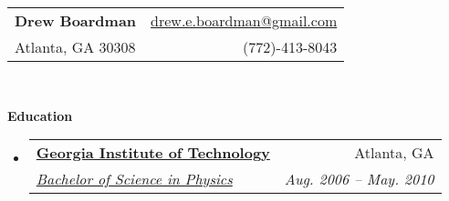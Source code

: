 \documentclass[letterpaper,11pt]{article}
\makeatletter
\newcommand{\resheading}[1]{{\large \colorbox{mygrey}{\begin{minipage}{\textwidth}{\textbf{#1 \vphantom{p\^{E}}}}\end{minipage}}}}
\newcommand{\ressubheading}[4]{
\begin{tabular*}{6.5in}{l@{\extracolsep{\fill}}r}
		\textbf{#1} & #2 \\
		\textit{#3} & \textit{#4} \\
\end{tabular*}\vspace{-6pt}}
\makeatother
\begin{document}
\newcommand{\mywebheader}{
\begin{tabular*}{7in}{l@{\extracolsep{\fill}}r}
	\textbf{{\LARGE Drew Boardman}} & \href{mailto:drew.e.boardman@gmail.com}{drew.e.boardman@gmail.com}\\
	{\footnotesize {Atlanta, GA 30308}} & {(772)-413-8043} \\
	\end{tabular*}
\\
\vspace{0.1in}}

\mywebheader


\resheading{Education}
\begin{itemize}
\item
\ressubheading{\href{http://www.gatech.edu}{Georgia Institute of Technology}}{Atlanta, GA}{\href{http://www.catalog.gatech.edu/colleges/cos/physics/ugrad/phy/geninfo.php}{Bachelor of Science in Physics}}{Aug. 2006 -- May. 2010}
\end{itemize} %
\end{document}
